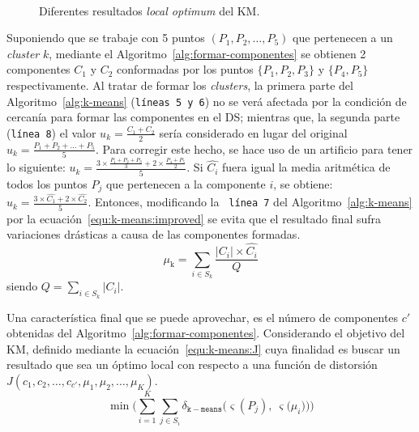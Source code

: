 \begin{figure}[h!]
	\centering
	\setlength{\fboxsep}{0pt}
	 { }
	\\
	 { }
	\caption{Diferentes resultados \textit{local optimum} del KM.}
	\label{fig:cap-segmentacion:diferentes-resultadosKM}
\end{figure}

Suponiendo que se trabaje con 5 puntos $(P_1, P_2, \dots, P_5)$ que pertenecen a
 un \textit{cluster} $k$, mediante el Algoritmo~\ref{alg:formar-componentes} se
  obtienen 2 componentes $C_1$ y $C_2$ conformadas por los puntos
   $\lbrace{P_1, P_2, P_3}\rbrace$ y $\lbrace P_4, P_5\rbrace$ respectivamente.
    Al tratar de formar los \textit{clusters}, la primera parte del 
    Algoritmo~\ref{alg:k-means} (\texttt{\color{gray}líneas 5 y 6}) no se verá 
    afectada  por la condición de cercanía para formar las componentes en el DS;
     mientras que, la segunda parte (\texttt{\color{gray}línea 8}) el valor 
     $u_k = \frac{C_1+C_2}{2}$ sería considerado en lugar del original 
     $u_k = \frac{P_1 + P_2 + \dots + P_5}{5}$. Para corregir este hecho, se 
     hace uso de un artificio para tener lo siguiente:
$\displaystyle u_k = \frac{3\times \frac{P_1 + P_2 + P_3}{3} + 2\times \frac{P_4 + P_5}{2}}{5}$. Si $\widehat{C_i}$ 
fuera igual la media aritmética de todos los puntos $P_j$ que pertenecen a la
 componente $i$, se obtiene: 
$u_k = \frac{3\times \widehat{C_1} + 2\times \widehat{C_2}}{5}$. 
Entonces, modificando la \texttt{\color{gray} línea 7} del 
Algoritmo~\ref{alg:k-means} por la ecuación~\ref{equ:k-means:improved} se evita 
que el resultado final sufra variaciones drásticas a causa de las componentes 
formadas.
\begin{equation}
\mu_\text{k}  =  \sum_{i \in S_k}^{}{\frac{|C_i| \times \widehat{C_i}}{Q}}
\label{equ:k-means:improved}
\end{equation}
siendo $\displaystyle Q = \sum_{i \in S_k}^{}{|C_i|}$.

Una característica final que se puede aprovechar, es el número de componentes
 $c'$ obtenidas del Algoritmo~\ref{alg:formar-componentes}. Considerando el 
 objetivo del KM, definido mediante la ecuación~\ref{equ:k-means:J} cuya
  finalidad es buscar un resultado que sea un óptimo local con respecto a una 
  función de distorsión $J(c_1, c_2, \dots, c_{c'}, \mu_1, \mu_2, \dots, \mu_K)$.
\begin{equation}
\min \big( \sum_{i=1}^{K}{\sum_{j \in S_i}^{} {\delta_{\mathtt{k-means}}(\varsigma(P_j), ~\varsigma(\mu _i}))} \big)
\label{equ:k-means:J}
\end{equation}

